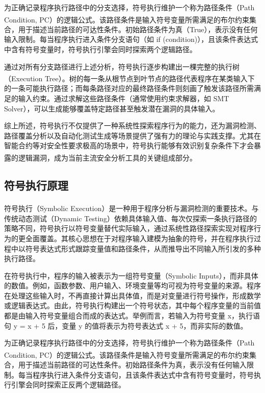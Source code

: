 \documentclass[print, master, vlined, timesmath]{DissertUESTC}
\begin{document}
为正确记录程序执行路径中的分支选择，符号执行维护一个称为路径条件（Path Condition, PC）的逻辑公式\textsuperscript{\cite{...}}。该路径条件是输入符号变量所需满足的布尔约束集合，用于描述当前路径的可达性条件。初始路径条件为真（True），表示没有任何输入限制。每当程序执行进入条件分支语句（如 if (condition)），且该条件表达式中含有符号变量时，符号执行引擎会同时探索两个逻辑路径。

通过对所有分支路径进行上述分析，符号执行逐步构建出一棵完整的执行树（Execution Tree）\textsuperscript{\cite{...}}。树的每一条从根节点到叶节点的路径代表程序在某类输入下的一条可能执行路径；而每条路径对应的最终路径条件则刻画了触发该路径所需满足的输入约束。通过求解这些路径条件（通常使用约束求解器，如 SMT Solver），可以生成能够覆盖特定路径甚至触发潜在漏洞的具体输入。

综上所述，符号执行不仅提供了一种系统性探索程序行为的能力，还为漏洞检测、路径覆盖分析以及自动化测试生成等场景提供了强有力的理论与实践支撑。尤其在智能合约等对安全性要求极高的场景中，符号执行能够有效识别复杂条件下才会暴露的逻辑漏洞，成为当前主流安全分析工具的关键组成部分\textsuperscript{\cite{...}}。

\subsection{符号执行原理}
符号执行（Symbolic Execution）是一种用于程序分析与漏洞检测的重要技术\textsuperscript{\cite{...}}。与传统动态测试（Dynamic Testing）依赖具体输入值、每次仅探索一条执行路径的策略不同，符号执行以符号变量替代实际输入，通过系统性路径探索实现对程序行为的更全面覆盖。其核心思想在于对程序输入建模为抽象的符号，并在程序执行过程中以符号表达式形式跟踪变量值和路径条件，从而推导出不同输入所引发的多种执行路径。

在符号执行中，程序的输入被表示为一组符号变量（Symbolic Inputs），而非具体的数值。例如，函数参数、用户输入、环境变量等均可视为符号变量的来源。程序在处理这些输入时，不再直接计算出具体值，而是对变量进行符号操作，形成数学或逻辑表达式。由此，符号执行构建出一个符号状态，其中每个程序变量的当前值都是由输入符号变量组合而成的表达式。举例而言，若输入为符号变量 x，执行语句 y = x + 5 后，变量 y 的值将表示为符号表达式 x + 5，而非实际的数值。

为正确记录程序执行路径中的分支选择，符号执行维护一个称为路径条件（Path Condition, PC）的逻辑公式\textsuperscript{\cite{...}}。该路径条件是输入符号变量所需满足的布尔约束集合，用于描述当前路径的可达性条件。初始路径条件为真，表示没有任何输入限制。每当程序执行进入条件分支语句，且该条件表达式中含有符号变量时，符号执行引擎会同时探索正反两个逻辑路径。
\end{document}

